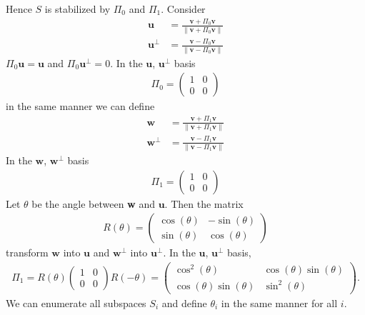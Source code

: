 \documentclass{article}
\begin{document}
Hence $S$ is stabilized by $\Pi_{0}$ and $\Pi_{1}$. Consider \begin{align}\textbf{u} &= \frac{\textbf{v} + \Pi_{0}\textbf{v}}{\lVert \textbf{v} + \Pi_{0}\textbf{v} \rVert}\\
\textbf{u}^{\perp} &= \frac{\textbf{v} - \Pi_{0}\textbf{v}}{\lVert \textbf{v} - \Pi_{0}\textbf{v}\rVert}
\end{align} $\Pi_{0}\textbf{u} = \textbf{u}$ and $\Pi_{0}\textbf{u}^{\perp}=0$. In the $\textbf{u}$, $\textbf{u}^{\perp}$ basis \begin{align}
    \Pi_{0}=\begin{pmatrix}1 & 0\\0 & 0\end{pmatrix}
\end{align} in the same manner we can define \begin{align}\textbf{w} &= \frac{\textbf{v} + \Pi_{1}\textbf{v}}{\lVert \textbf{v} + \Pi_{1}\textbf{v} \rVert}\\
\textbf{w}^{\perp} &= \frac{\textbf{v} - \Pi_{1}\textbf{v}}{\lVert \textbf{v} - \Pi_{1}\textbf{v}\rVert}
\end{align} In the $\textbf{w}$, $\textbf{w}^{\perp}$ basis \begin{align}
    \Pi_{1} = \begin{pmatrix}1 & 0\\0 & 0\end{pmatrix}
\end{align} Let $\theta$ be the angle between \textbf{w} and $\textbf{u}$. Then the matrix \begin{align}
    R(\theta) = \begin{pmatrix}\cos(\theta) & -\sin(\theta)\\\sin(\theta) & \cos(\theta)\end{pmatrix}
\end{align} transform $\textbf{w}$ into $\textbf{u}$ and $\textbf{w}^{\perp}$ into $\textbf{u}^{\perp}$. In the $\textbf{u}$, $\textbf{u}^{\perp}$ basis, \begin{align}
    \Pi_{1} = R(\theta)\begin{pmatrix}1 & 0\\0 & 0\end{pmatrix}R(-\theta) = \begin{pmatrix}\cos^{2}(\theta) & \cos(\theta)\sin(\theta)\\\cos(\theta)\sin(\theta) & \sin^{2}(\theta)\end{pmatrix}.
\end{align} We can enumerate all subspaces $S_{i}$ and define $\theta_{i}$ in the same manner for all $i$.
\end{document}
